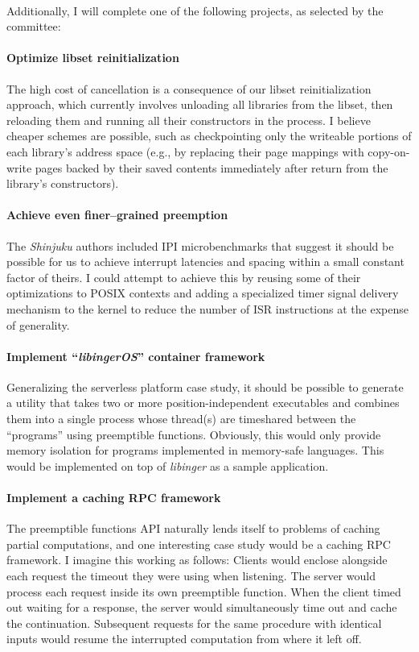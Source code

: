 \documentclass[12pt,letterpaper,openright]{report}
\begin{document}
\hfill \\
\noindent
Additionally, I will complete one of the following projects, as selected by the
committee:

\paragraph{Optimize libset reinitialization}
The high cost of cancellation is a consequence of our libset reinitialization
approach, which currently involves unloading all libraries from the libset, then
reloading them and running all their constructors in the process.  I believe cheaper
schemes are possible, such as checkpointing only the writeable portions of each
library's address space (e.g., by replacing their page mappings with copy-on-write
pages backed by their saved contents immediately after return from the library's
constructors).

\paragraph{Achieve even finer--grained preemption}
The \textit{Shinjuku} authors included IPI microbenchmarks that suggest it should be
possible for us to achieve interrupt latencies and spacing within a small constant
factor of theirs.  I could attempt to achieve this by reusing some of their
optimizations to POSIX contexts and adding a specialized timer signal delivery
mechanism to the kernel to reduce the number of ISR instructions at the expense of
generality.

\paragraph{Implement ``\textit{libingerOS}'' container framework}
Generalizing the serverless platform case study, it should be possible to generate a
utility that takes two or more position-independent executables and combines them
into a single process whose thread(s) are timeshared between the ``programs'' using
preemptible functions.  Obviously, this would only provide memory isolation for
programs implemented in memory-safe languages.  This would be implemented on top of
\textit{libinger} as a sample application.

\paragraph{Implement a caching RPC framework}
The preemptible functions API naturally lends itself to problems of caching partial
computations, and one interesting case study would be a caching RPC framework.  I
imagine this working as follows:  Clients would enclose alongside each request the
timeout they were using when listening.  The server would process each request inside
its own preemptible function.  When the client timed out waiting for a response, the
server would simultaneously time out and cache the continuation.  Subsequent requests
for the same procedure with identical inputs would resume the interrupted computation
from where it left off.
\end{document}
